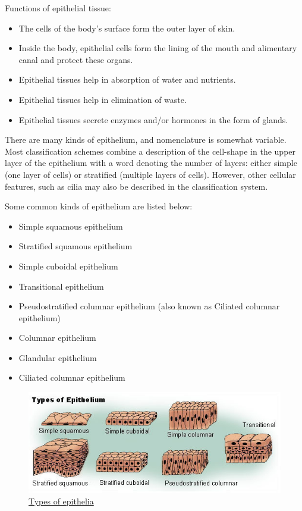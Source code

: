 Functions of epithelial tissue:

\begin{itemize}
\tightlist
\item
  The cells of the body's surface form the outer layer of skin.
\item
  Inside the body, epithelial cells form the lining of the mouth and
  alimentary canal and protect these organs.
\item
  Epithelial tissues help in absorption of water and nutrients.
\item
  Epithelial tissues help in elimination of waste.
\item
  Epithelial tissues secrete enzymes and/or hormones in the form of
  glands.
\end{itemize}

There are many kinds of epithelium, and nomenclature is somewhat
variable. Most classification schemes combine a description of the
cell-shape in the upper layer of the epithelium with a word denoting the
number of layers: either simple (one layer of cells) or stratified
(multiple layers of cells). However, other cellular features, such as
cilia may also be described in the classification system.

Some common kinds of epithelium are listed below:

\begin{itemize}
\tightlist
\item
  Simple squamous epithelium
\item
  Stratified squamous epithelium
\item
  Simple cuboidal epithelium
\item
  Transitional epithelium
\item
  Pseudostratified columnar epithelium (also known as Ciliated columnar
  epithelium)
\item
  Columnar epithelium
\item
  Glandular epithelium
\item
  Ciliated columnar epithelium
\end{itemize}

\begin{figure}

{\centering \includegraphics[width=0.7\linewidth]{./figures/tissues/epithelium}

}

\caption{\href{https://commons.wikimedia.org/wiki/File:Illu_epithelium.jpg}{Types
of epithelia}}\label{fig:epithelium}
\end{figure}

